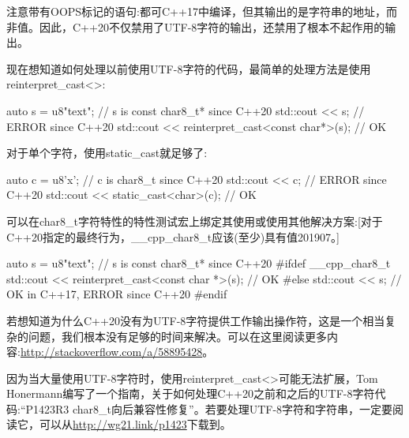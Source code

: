 注意带有OOPS标记的语句:都可C++17中编译，但其输出的是字符串的地址，而非值。因此，C++20不仅禁用了UTF-8字符的输出，还禁用了根本不起作用的输出。


现在想知道如何处理以前使用UTF-8字符的代码，最简单的处理方法是使用reinterpret\_cast<>:

\begin{cpp}
auto s = u8"text"; // s is const char8_t* since C++20
std::cout << s; // ERROR since C++20
std::cout << reinterpret_cast<const char*>(s); // OK
\end{cpp}

对于单个字符，使用static\_cast就足够了:

\begin{cpp}
auto c = u8'x'; // c is char8_t since C++20
std::cout << c; // ERROR since C++20
std::cout << static_cast<char>(c); // OK
\end{cpp}

可以在char8\_t字符特性的特性测试宏上绑定其使用或使用其他解决方案:[对于C++20指定的最终行为，\_\_cpp\_char8\_t应该(至少)具有值201907。]

\begin{cpp}
auto s = u8"text"; // s is const char8_t* since C++20
#ifdef __cpp_char8_t
std::cout << reinterpret_cast<const char *>(s); // OK
#else
std::cout << s; // OK in C++17, ERROR since C++20
#endif
\end{cpp}

若想知道为什么C++20没有为UTF-8字符提供工作输出操作符，这是一个相当复杂的问题，我们根本没有足够的时间来解决。可以在这里阅读更多内容:\url{http://stackoverflow.com/a/58895428}。

因为当大量使用UTF-8字符时，使用reinterpret\_cast<>可能无法扩展，Tom Honermann编写了一个指南，关于如何处理C++20之前和之后的UTF-8字符代码:“P1423R3 char8\_t向后兼容性修复”。若要处理UTF-8字符和字符串，一定要阅读它，可以从\url{http://wg21.link/p1423}下载到。

































